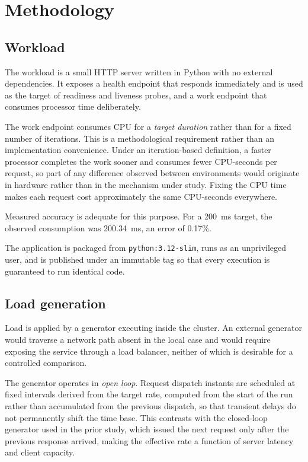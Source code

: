\documentclass[conference]{IEEEtran}
\begin{document}
\section{Methodology}

\subsection{Workload}

The workload is a small HTTP server written in Python with no external
dependencies. It exposes a health endpoint that responds immediately and is used
as the target of readiness and liveness probes, and a work endpoint that
consumes processor time deliberately.

The work endpoint consumes CPU for a \emph{target duration} rather than for a
fixed number of iterations. This is a methodological requirement rather than an
implementation convenience. Under an iteration-based definition, a faster
processor completes the work sooner and consumes fewer CPU-seconds per request,
so part of any difference observed between environments would originate in
hardware rather than in the mechanism under study. Fixing the CPU time makes
each request cost approximately the same CPU-seconds everywhere.

Measured accuracy is adequate for this purpose. For a 200~ms target, the
observed consumption was 200.34~ms, an error of 0.17\%.

The application is packaged from \texttt{python:3.12-slim}, runs as an
unprivileged user, and is published under an immutable tag so that every
execution is guaranteed to run identical code.

\subsection{Load generation}

Load is applied by a generator executing inside the cluster. An external
generator would traverse a network path absent in the local case and would
require exposing the service through a load balancer, neither of which is
desirable for a controlled comparison.

The generator operates in \emph{open loop}. Request dispatch instants are
scheduled at fixed intervals derived from the target rate, computed from the
start of the run rather than accumulated from the previous dispatch, so that
transient delays do not permanently shift the time base. This contrasts with the
closed-loop generator used in the prior study, which issued the next request
only after the previous response arrived, making the effective rate a function
of server latency and client capacity.
\end{document}
